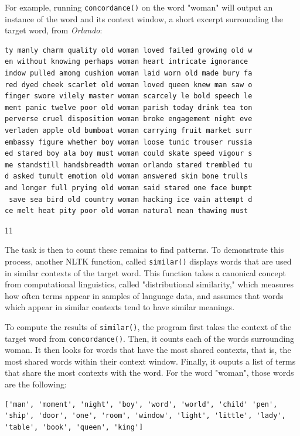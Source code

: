 \documentclass[11pt]{article}
\begin{document}
For example, running \texttt{concordance()} on the word "woman" will output
an instance of the word and its context window, a short excerpt
surrounding the target word, from \emph{Orlando}:

\begin{verbatim}
ty manly charm quality old woman loved failed growing old w
en without knowing perhaps woman heart intricate ignorance 
indow pulled among cushion woman laid worn old made bury fa
red dyed cheek scarlet old woman loved queen knew man saw o
finger swore vilely master woman scarcely le bold speech le
ment panic twelve poor old woman parish today drink tea ton
perverse cruel disposition woman broke engagement night eve
verladen apple old bumboat woman carrying fruit market surr
embassy figure whether boy woman loose tunic trouser russia
ed stared boy ala boy must woman could skate speed vigour s
me standstill handsbreadth woman orlando stared trembled tu
d asked tumult emotion old woman answered skin bone trulls 
and longer full prying old woman said stared one face bumpt
 save sea bird old country woman hacking ice vain attempt d
ce melt heat pity poor old woman natural mean thawing must  
\end{verbatim}

11

The task is then to count these remains to find patterns. To
demonstrate this process, another NLTK function, called \texttt{similar()}
displays words that are used in similar contexts of the target word.
This function takes a canonical concept from computational
linguistics, called "distributional similarity," which measures how
often terms appear in samples of language data, and assumes that words
which appear in similar contexts tend to have similar meanings.

To compute the results of \texttt{similar()}, the program first takes the
context of the target word from \texttt{concordance()}. Then, it counts each
of the words surrounding woman. It then looks for words that have the
most shared contexts, that is, the most shared words within their
context window. Finally, it ouputs a list of terms that share the most
contexts with the word. For the word "woman", those words are the
following:

\begin{verbatim}
['man', 'moment', 'night', 'boy', 'word', 'world', 'child' 'pen',
'ship', 'door', 'one', 'room', 'window', 'light', 'little', 'lady',
'table', 'book', 'queen', 'king']
\end{verbatim}
\end{document}
